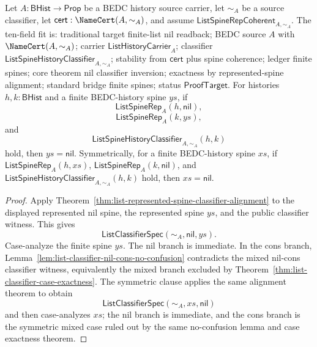 \begin{theorem}
\label{thm:list-represented-spine-nil-classifier-inversion}
Let $A:\mathsf{BHist}\to\mathsf{Prop}$ be a BEDC history source carrier, let
$\sim_A$ be a source classifier, let $\mathsf{cert}:\NameCert(A,\sim_A)$, and
assume $\mathsf{ListSpineRepCoherent}_{A,\sim_A}$. The ten-field fit is:
traditional target finite-list nil readback; BEDC source $A$ with
$\NameCert(A,\sim_A)$; carrier $\mathsf{ListHistoryCarrier}_A$; classifier
$\mathsf{ListSpineHistoryClassifier}_{A,\sim_A}$; stability from
$\mathsf{cert}$ plus spine coherence; ledger finite spines; core theorem nil
classifier inversion; exactness by represented-spine alignment; standard bridge
finite spines; status $\mathsf{ProofTarget}$. For histories $h,k:\mathsf{BHist}$
and a finite BEDC-history spine $ys$, if
$$
\mathsf{ListSpineRep}_A(h,\mathsf{nil}),
$$
$$
\mathsf{ListSpineRep}_A(k,ys),
$$
and
$$
\mathsf{ListSpineHistoryClassifier}_{A,\sim_A}(h,k)
$$
hold, then $ys=\mathsf{nil}$. Symmetrically, for a finite BEDC-history spine
$xs$, if $\mathsf{ListSpineRep}_A(h,xs)$,
$\mathsf{ListSpineRep}_A(k,\mathsf{nil})$, and
$\mathsf{ListSpineHistoryClassifier}_{A,\sim_A}(h,k)$ hold, then
$xs=\mathsf{nil}$.
\end{theorem}
\begin{proof}
Apply Theorem~\ref{thm:list-represented-spine-classifier-alignment} to the
displayed represented nil spine, the represented spine $ys$, and the public
classifier witness. This gives
$$
\mathsf{ListClassifierSpec}(\sim_A,\mathsf{nil},ys).
$$
Case-analyze the finite spine $ys$. The nil branch is immediate. In the cons
branch, Lemma~\ref{lem:list-classifier-nil-cons-no-confusion} contradicts the
mixed nil-cons classifier witness, equivalently the mixed branch excluded by
Theorem~\ref{thm:list-classifier-case-exactness}. The symmetric clause applies
the same alignment theorem to obtain
$$
\mathsf{ListClassifierSpec}(\sim_A,xs,\mathsf{nil})
$$
and then case-analyzes $xs$; the nil branch is immediate, and the cons branch is
the symmetric mixed case ruled out by the same no-confusion lemma and case
exactness theorem.
\end{proof}


